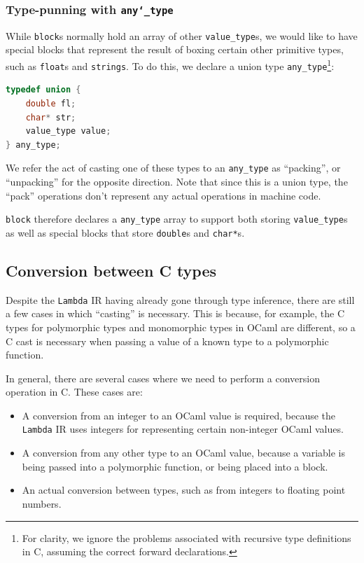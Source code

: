 \subsubsection{Type-punning with \texttt{any\char`_type}}

While \texttt{block}s normally hold an array of other \verb|value_type|s, we
would like to have special blocks that represent the result of boxing certain
other primitive types, such as \texttt{float}s and \texttt{strings}. To do this,
we declare a union type \verb|any_type|\footnote{For clarity, we ignore the
problems associated with recursive type definitions in C, assuming the correct
forward declarations.}:

\begin{lstlisting}[language=C]
typedef union {
    double fl;
    char* str;
    value_type value;
} any_type;
\end{lstlisting}

We refer the act of casting one of these types to an \verb|any_type| as
``packing'', or ``unpacking'' for the opposite direction. Note that since this
is a union type, the ``pack'' operations don't represent any actual operations
in machine code.

\texttt{block} therefore declares a \verb|any_type| array to support both
storing \verb|value_type|s as well as special blocks that store \verb|double|s
and \verb|char*|s.

\subsection{Conversion between C types}\label{casting}

Despite the \texttt{Lambda} IR having already gone through type inference,
there are still a few cases in which ``casting'' is necessary. This is because,
for example, the C types for polymorphic types and monomorphic types in OCaml
are different, so a C cast is necessary when passing a value of a known type to
a polymorphic function.

In general, there are several cases where we need to perform a conversion
operation in C. These cases are: 

\begin{itemize}

\item A conversion from an integer to an OCaml value is required, because the
    \texttt{Lambda} IR uses integers for representing certain non-integer OCaml
    values.

\item A conversion from any other type to an OCaml value, because a variable is
    being passed into a polymorphic function, or being placed into a block.

\item An actual conversion between types, such as from integers to floating
    point numbers.

\end{itemize}

